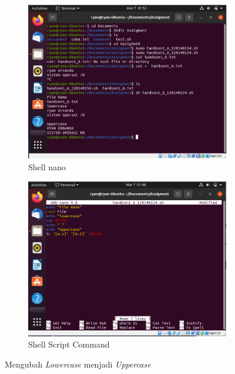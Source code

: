 \documentclass[11pt,a4paper]{article}
\begin{document}
    \begin{figure}[h]
	\centering
	\begin{subfigure}[b]{0.4\textwidth}
		\centering
		\def\svgwidth{\columnwidth}
		\includegraphics[width=1\textwidth]{Gambar/Assigment 6 command.png}
		\caption{Shell nano}
		\label{fig:aug-1}
	\end{subfigure}
	\qquad %
	\begin{subfigure}[b]{0.4\textwidth}
		\centering
		\def\svgwidth{\columnwidth}
		\includegraphics[width=1\textwidth]{Gambar/Assigment 6 shell.png}
		\caption{Shell Script Command}
		\label{fig:aug-2}
	\end{subfigure}
	\caption{Mengubah \textit{Lowercase} menjadi \textit{Uppercase}}\label{fig:aug}
\end{figure}
    
\end{document}
